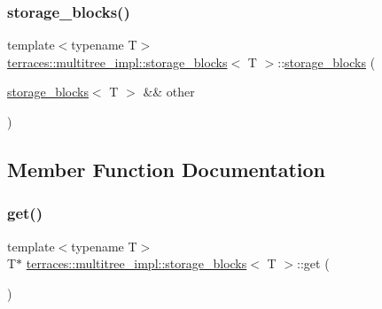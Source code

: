\mbox{\label{classterraces_1_1multitree__impl_1_1storage__blocks_af4305d0aea87f46cbea75eb2994e2001}} 
\subsubsection{\texorpdfstring{storage\+\_\+blocks()}{storage\_blocks()}\hspace{0.1cm}{\footnotesize\ttfamily [3/3]}}
{\footnotesize\ttfamily template$<$typename T$>$ \\
\hyperlink{classterraces_1_1multitree__impl_1_1storage__blocks}{terraces\+::multitree\+\_\+impl\+::storage\+\_\+blocks}$<$ T $>$\+::\hyperlink{classterraces_1_1multitree__impl_1_1storage__blocks}{storage\+\_\+blocks} (\begin{DoxyParamCaption}\item[{\hyperlink{classterraces_1_1multitree__impl_1_1storage__blocks}{storage\+\_\+blocks}$<$ T $>$ \&\&}]{other }\end{DoxyParamCaption})\hspace{0.3cm}{\ttfamily [default]}}



\subsection{Member Function Documentation}
\mbox{\label{classterraces_1_1multitree__impl_1_1storage__blocks_a803e0b2bf8f057b661847ba9caedec41}} 
\subsubsection{\texorpdfstring{get()}{get()}}
{\footnotesize\ttfamily template$<$typename T$>$ \\
T$\ast$ \hyperlink{classterraces_1_1multitree__impl_1_1storage__blocks}{terraces\+::multitree\+\_\+impl\+::storage\+\_\+blocks}$<$ T $>$\+::get (\begin{DoxyParamCaption}{ }\end{DoxyParamCaption})\hspace{0.3cm}{\ttfamily [inline]}}

